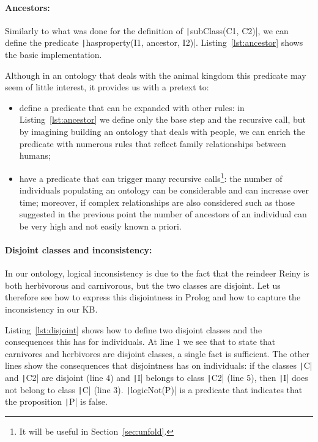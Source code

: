 \paragraph{Ancestors:}  Similarly to what was done for the definition of \texttt|subClass(C1, C2)|, we can define the predicate \texttt|hasproperty(I1, ancestor, I2)|. Listing~\ref{lst:ancestor} shows the basic implementation. 

\begin{listing}[h]
	\caption{Ancestor definition}
	\label{lst:ancestor}
\end{listing}

Although in an ontology that deals with the animal kingdom this predicate may seem of little interest, it provides us with a pretext to:
\begin{itemize}
	\item define a predicate that can be expanded with other rules: in Listing~\ref{lst:ancestor} we define only the base step and the recursive call, but by imagining building an ontology that deals with people, we can enrich the predicate with numerous rules that reflect family relationships between humans;
	\item have a predicate that can trigger many recursive calls\footnote{It will be useful in Section~\ref{sec:unfold}.}: the number of individuals populating an ontology can be considerable and can increase over time; moreover, if complex relationships are also considered \textemdash{}such as those suggested in the previous point\textemdash{} the number of ancestors of an individual can be very high and not easily known a priori.
\end{itemize}

\paragraph{Disjoint classes and inconsistency:} In our ontology, logical inconsistency is due to the fact that the reindeer Reiny is both herbivorous and carnivorous, but the two classes are disjoint. Let us therefore see how to express this disjointness in Prolog and how to capture the inconsistency in our KB.

Listing~\ref{lst:disjoint} shows how to define two disjoint classes and the consequences this has for individuals. At line $1$ we see that to state that carnivores and herbivores are disjoint classes, a single fact is sufficient. The other lines show the consequences that disjointness has on individuals: if the classes \texttt|C| and \texttt|C2| are disjoint (line $4$) and \texttt|I| belongs to class \texttt|C2| (line $5$), then \texttt|I| does not belong to class \texttt|C| (line $3$). \texttt|logicNot(P)| is a predicate that indicates that the proposition \texttt|P| is false. 

